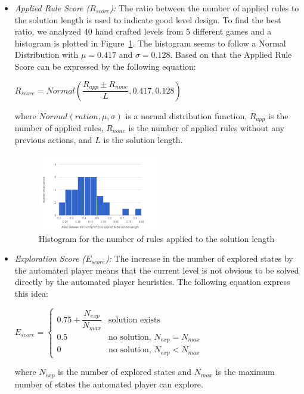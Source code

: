 \documentclass[letterpaper]{article}
\newcommand{\figref}[1]{Figure~\ref{Figure:#1}}
\begin{document}
\begin{itemize}
	\item \emph{Applied Rule Score ($R_{score}$):} The ratio between the number of applied rules to the solution length is used to indicate good level design. To find the best ratio, we analyzed 40 hand crafted levels from 5 different games and a histogram is plotted in \figref{rulesSolutionLengthHistogram}. The histogram seems to follow a Normal Distribution with $\mu = 0.417$ and $\sigma = 0.128$. Based on that the Applied Rule Score can be expressed by the following equation:
	\begin{center}$R_{score} = Normal(\dfrac{R_{app} \pm R_{none}}{L}, 0.417, 0.128)$\end{center}
	where $Normal(ration, \mu, \sigma)$ is a normal distribution function, $R_{app}$ is the number of applied rules, $R_{none}$ is the number of applied rules without any previous actions, and $L$ is the solution length.
	\begin{figure}[ht]
		\centering
		\includegraphics[width=0.5\textwidth]{Images/rulesSolutionLengthHistogram}
		\caption{Histogram for the number of rules applied to the solution length}
		\label{Figure:rulesSolutionLengthHistogram}
	\end{figure}
	
	\item \emph{Exploration Score ($E_{score}$):} The increase in the number of explored states by the automated player means that the current level is not obvious to be solved directly by the automated player heuristics. The following equation express this idea:
	\begin{center}
	$E_{score}= \begin{cases}
	               0.75 + \dfrac{N_{exp}}{N_{max}} & \text{solution exists}\\
	               0.5 & \text{no solution, }N_{exp} = N_{max}\\
	               0 & \text{no solution, }N_{exp} < N_{max}
	           \end{cases}$
	\end{center}
	where $N_{exp}$ is the number of explored states and $N_{max}$ is the maximum number of states the automated player can explore.
\end{itemize}
\end{document}
